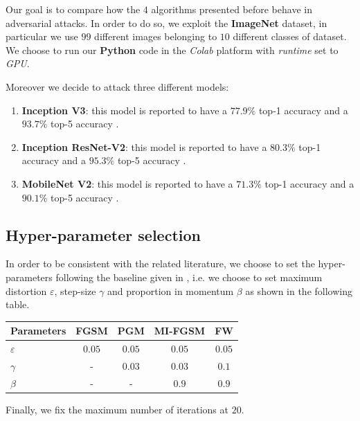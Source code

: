 \documentclass[10pt,twocolumn,letterpaper, english]{article}
\theoremstyle{definition}
\theoremstyle{plain}
\theoremstyle{plain}
\theoremstyle{plain}
\theoremstyle{plain}
\theoremstyle{remark}
\theoremstyle{remark}
\theoremstyle{definition}
\theoremstyle{definition}
\theoremstyle{definition}
\theoremstyle{definition}
\renewcommand{\epsilon}{\varepsilon}
\begin{document}
Our goal is to compare how the $4$ algorithms presented before behave in adversarial attacks. 
In order to do so, we exploit the \textbf{ImageNet} dataset, in particular we use $99$ different images belonging to $10$ different classes of dataset. 
We choose to run our \textbf{Python} code in the \textit{Colab} platform with \textit{runtime} set to \textit{GPU}.

Moreover we decide to attack three different models: 
\begin{enumerate}
    \item \textbf{Inception V3}: this model is reported to have a $77.9\%$ top-1 accuracy and a $93.7\%$ top-5 accuracy \cite{keras}.
    \item \textbf{Inception ResNet-V2}: this model is reported to have a $80.3\%$ top-1 accuracy and a	$95.3\%$ top-5 accuracy \cite{keras}.
    \item \textbf{MobileNet V2}: this model is reported to have a $71.3\%$ top-1 accuracy and a	$90.1\%$ top-5 accuracy \cite{keras}.
    
\end{enumerate}


\subsection{Hyper-parameter selection}

In order to be consistent with the related literature, we choose to set the hyper-parameters following the baseline given in \cite{frank}, i.e. we choose to set maximum distortion $\epsilon$, step-size $\gamma$ and proportion in momentum $\beta$ as shown in the following table. 


\begin{center}
    \begin{tabular}{l|c|c|c|c}
    \hline
     Parameters & FGSM & PGM & MI-FGSM & FW \\
     \hline
     $\epsilon$ & $0.05$ & $0.05$ & $0.05$ & $0.05$  \\
     
     $\gamma$ & - & $0.03$ & $0.03$ & $0.1$ \\
     
     $\beta$ & - & - & $0.9$ & $0.9$  \\
    \hline
   \end{tabular}
\end{center}

Finally, we fix the maximum number of iterations at $20$. 
\end{document}
